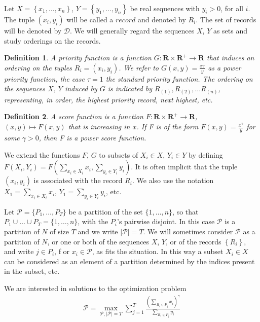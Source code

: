\documentclass{article}
\newtheorem{definition}{Definition}
\theoremstyle{case}
\begin{document}
Let $X = \left\lbrace x_1, \dots, x_n\right\rbrace$, $Y = \left\lbrace y_1, \dots, y_n\right\rbrace$ be real sequences with $y_i > 0$, for all $i$. The tuple $\left(x_i, y_i\right)$ will be called a $\textit{record}$ and denoted by $R_i$. The set of records will be denoted by $\mathcal{D}$. We will generally regard the sequences $X$, $Y$ as sets and study orderings on the records.

\begin{definition}
A priority function is a function $G\colon \mathbf{R} \times \mathbf{R}^{+} \to \mathbf{R}$ that induces an ordering on the tuples $R_i = \left(x_i, y_i\right)$. We refer to $G(x,y) = \frac{x\tau}{y}$ as a power priority function, the case $\tau = 1$ the standard priority function. The ordering on the sequences $X$, $Y$ induced by $G$ is indicated by $R_{(1)}, R_{(2)}, \dots R_{(n)}$, representing, in order, the highest priority record, next highest, etc. 
\end{definition}

\begin{definition}
A score function is a function $F\colon \mathbf{R} \times \mathbf{R}^{+} \to \mathbf{R}$, $(x,y)\mapsto F(x,y)$ that is increasing in $x$. If F is of the form $F(x,y) = \frac{x^\gamma}{y}$ for some $\gamma > 0$, then F is a power score function. 
\end{definition}

We extend the functions $F$, $G$ to subsets of $X_i \in X$, $Y_i \in Y$ by defining $F(X_i, Y_i) = F(\sum_{x_i \in X_i} x_i, \sum_{y_i \in Y_i} y_i)$. It is often implicit that the tuple $\left(x_i, y_i\right)$ is associated with the record $R_i$. We also use the notation $X_1 = \sum_{x_i \in X_i}x_i$, $Y_1 = \sum_{y_i \in Y_i}y_i$, etc.

Let $\mathcal{P} = \{P_1, \dots, P_T\}$ be a partition of the set $\{1, \dots, n\}$, so that $P_1 \cup \dots \cup P_T = \{1, \dots, n\}$, with the $P_i$'s pairwise disjoint. In this case $\mathcal{P}$ is a partition of $N$ of size $T$ and we write $\vert \mathcal{P} \vert = T$. We will sometimes consider $\mathcal{P}$ as a partition of $N$, or one or both of the sequences $X$, $Y$, or of the records $\left\lbrace R_i\right\rbrace$, and write $j \in P_i$, f or $x_i \in \mathcal{P}$, as fits the situation. In this way a subset $X_i \in X$ can be considered as an element of a partition determined by the indices present in the subset, etc.

We are interested in solutions to the optimization problem
\begin{align} \label{eq1}
\mathcal{P} = \max_{\mathcal{P}, \vert \mathcal{P} \vert = T}\sum_{j=1}^{T}\frac{(\sum_{R_i \in P_j}x_i)^\gamma}{\sum_{R_i \in P_j}y_i}
\end{align}
\end{document}
